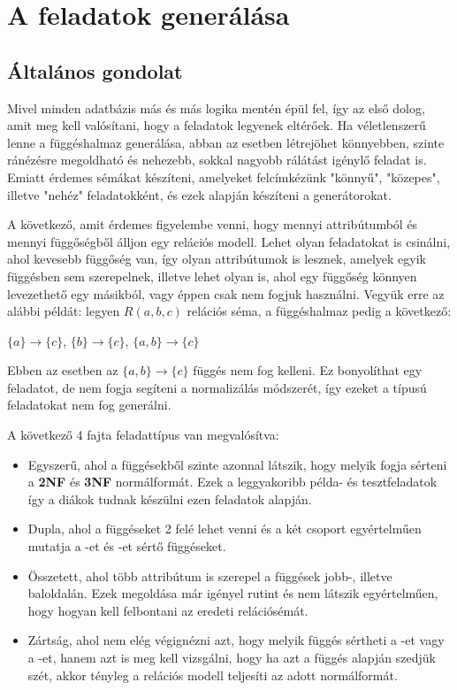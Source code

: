 \chapter{A feladatok generálása}

\section{Általános gondolat}
Mivel minden adatbázis más és más logika mentén épül fel, így az első dolog, amit meg kell valósítani, hogy a feladatok legyenek eltérőek. Ha véletlenszerű lenne a függéshalmaz generálása, abban az esetben létrejöhet könnyebben, szinte ránézésre megoldható és nehezebb, sokkal nagyobb rálátást igénylő feladat is. Emiatt érdemes sémákat készíteni, amelyeket felcímkézünk "könnyű", "közepes", illetve "nehéz" feladatokként, és ezek alapján készíteni a generátorokat. \par
A következő, amit érdemes figyelembe venni, hogy mennyi attribútumból és mennyi függőségből álljon egy relációs modell. Lehet olyan feladatokat is csinálni, ahol kevesebb függőség van, így olyan attribútumok is lesznek, amelyek egyik függésben sem szerepelnek, illetve lehet olyan is, ahol egy függőség könnyen levezethető egy másikból, vagy éppen csak nem fogjuk használni. Vegyük erre az alábbi példát: legyen $R(a,b,c)$ relációs séma, a függéshalmaz pedig a következő:
\begin{center}
    $\{a\} \longrightarrow \{c\}$, $\{b\} \longrightarrow \{c\}$, $\{a,b\} \longrightarrow \{c\}$
\end{center}
Ebben az esetben az $\{a,b\} \rightarrow \{c\}$ függés nem fog kelleni. Ez bonyolíthat egy feladatot, de nem fogja segíteni a normalizálás módszerét, így ezeket a típusú feladatokat nem fog generálni. \par
A következő 4 fajta feladattípus van megvalósítva:
\begin{itemize}
    \item Egyszerű, ahol a függésekből szinte azonnal látszik, hogy melyik fogja sérteni a \textbf{2NF} és \textbf{3NF} normálformát. Ezek a leggyakoribb példa- és tesztfeladatok így a diákok tudnak készülni ezen feladatok alapján.
    \item Dupla, ahol a függéseket 2 felé lehet venni és a két csoport egyértelműen mutatja a \nfk-et és \nfh-et sértő függéseket.
    \item Összetett, ahol több attribútum is szerepel a függések jobb-, illetve baloldalán. Ezek megoldása már igényel rutint és nem látszik egyértelműen, hogy hogyan kell felbontani az eredeti relációsémát.
    \item Zártság, ahol nem elég végignézni azt, hogy melyik függés sértheti a \nfk-et vagy a \nfh-et, hanem azt is meg kell vizsgálni, hogy ha azt a függés alapján szedjük szét, akkor tényleg a relációs modell teljesíti az adott normálformát.
\end{itemize}

